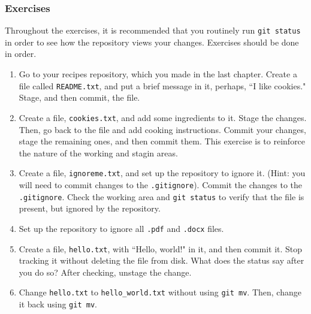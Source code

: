 \subsubsection{Exercises}
 Throughout the exercises, it is recommended that you routinely run
\verb`git status` in order to see how the repository views your changes.
Exercises should be done in order.
\begin{enumerate}
	\item Go to your recipes repository, which you made in the last chapter.
	   Create a file called \verb`README.txt`, and put a brief message in
	   it, perhaps, ``I like cookies." Stage, and then commit, the file.
	\item Create a file, \verb`cookies.txt`, and add some ingredients to it.
	   Stage the changes.
	   Then, go back to the file and add cooking instructions.
	   Commit your changes, stage the remaining ones, and then commit them.
	   This exercise is to reinforce the nature of the working and stagin
	   areas.
	\item Create a file, \verb`ignoreme.txt`, and set up the repository to
	   ignore it.
	   (Hint: you will need to commit changes to the \verb`.gitignore`).
	   Commit the changes to the \verb`.gitignore`.
	   Check the working area and \verb`git status` to verify that the file
	   is present, but ignored by the repository.
	\item Set up the repository to ignore all \verb`.pdf` and \verb`.docx`
	   files.
	\item Create a file, \verb`hello.txt`, with ``Hello, world!" in it,
	   and then commit it. Stop tracking it without deleting the file from
	   disk.
	   What does the status say after you do so?
	   After checking, unstage the change.
	\item Change \verb`hello.txt` to \verb`hello_world.txt` without using
	   \verb`git mv`.
	   Then, change it back using \verb`git mv`.
\end{enumerate}
